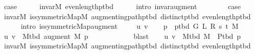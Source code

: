 \begin{isabellebody}
\ {\isacharquery}{\kern0pt}case\isanewline
\ \ \ \ \isamarkupfalse%
\ invar{\isacharunderscore}{\kern0pt}M\ even{\isacharunderscore}{\kern0pt}length{\isacharunderscore}{\kern0pt}p{\isacharunderscore}{\kern0pt}tbd\isanewline
\ \ \ \ \isamarkupfalse%
\ {\isacharparenleft}{\kern0pt}intro\ invar{\isacharunderscore}{\kern0pt}augment{\isacharparenright}{\kern0pt}\isanewline
{}\isamarkupfalse%
\isanewline
\ \ \isamarkupfalse%
\ {}\isanewline
\ \ \isamarkupfalse%
\ {\isacharquery}{\kern0pt}case\isanewline
\ \ \ \ \isamarkupfalse%
\ invar{\isacharunderscore}{\kern0pt}M\ is{\isacharunderscore}{\kern0pt}symmetric{\isacharunderscore}{\kern0pt}Map{\isacharunderscore}{\kern0pt}M\ augmenting{\isacharunderscore}{\kern0pt}path{\isacharunderscore}{\kern0pt}p{\isacharunderscore}{\kern0pt}tbd\ distinct{\isacharunderscore}{\kern0pt}p{\isacharunderscore}{\kern0pt}tbd\ even{\isacharunderscore}{\kern0pt}length{\isacharunderscore}{\kern0pt}p{\isacharunderscore}{\kern0pt}tbd\isanewline
\ \ \ \ \isamarkupfalse%
\ {\isacharparenleft}{\kern0pt}intro\ is{\isacharunderscore}{\kern0pt}symmetric{\isacharunderscore}{\kern0pt}Map{\isacharunderscore}{\kern0pt}augment{\isacharparenright}{\kern0pt}\isanewline
{}\isamarkupfalse%
\isanewline
\ \ \isamarkupfalse%
\ {\isacharparenleft}{\kern0pt}{}\ u\ v{\isacharparenright}{\kern0pt}\isanewline
\ \ \isamarkupfalse%
\ {\isacharquery}{\kern0pt}p\ {\isacharequal}{\kern0pt}\ {\isachardoublequoteopen}p{\isacharunderscore}{\kern0pt}tbd\ G\ L\ R\ s\ t\ M{\isachardoublequoteclose}\isanewline
\ \ \isamarkupfalse%
\ {\isachardoublequoteopen}{\isacharbraceleft}{\kern0pt}u{\isacharcomma}{\kern0pt}\ v{\isacharbraceright}{\kern0pt}\ {\isasymin}\ M{\isacharunderscore}{\kern0pt}tbd\ {\isacharparenleft}{\kern0pt}augment\ M\ {\isacharquery}{\kern0pt}p{\isacharparenright}{\kern0pt}{\isachardoublequoteclose}\isanewline
\ \ \ \ \isamarkupfalse%
\ {}\isanewline
\ \ \ \ \isamarkupfalse%
\ blast\isanewline
\ \ \isamarkupfalse%
\ {\isachardoublequoteopen}{\isacharbraceleft}{\kern0pt}u{\isacharcomma}{\kern0pt}\ v{\isacharbraceright}{\kern0pt}\ {\isasymin}\ M{\isacharunderscore}{\kern0pt}tbd\ M\ {\isasymoplus}\ P{\isacharunderscore}{\kern0pt}tbd\ {\isacharquery}{\kern0pt}p{\isachardoublequoteclose}\isanewline
\ \ \ \ \isamarkupfalse%
\ invar{\isacharunderscore}{\kern0pt}M\ is{\isacharunderscore}{\kern0pt}symmetric{\isacharunderscore}{\kern0pt}Map{\isacharunderscore}{\kern0pt}M\ augmenting{\isacharunderscore}{\kern0pt}path{\isacharunderscore}{\kern0pt}p{\isacharunderscore}{\kern0pt}tbd\ distinct{\isacharunderscore}{\kern0pt}p{\isacharunderscore}{\kern0pt}tbd\ even{\isacharunderscore}{\kern0pt}length{\isacharunderscore}{\kern0pt}p{\isacharunderscore}{\kern0pt}tbd\isanewline

\end{isabellebody}
